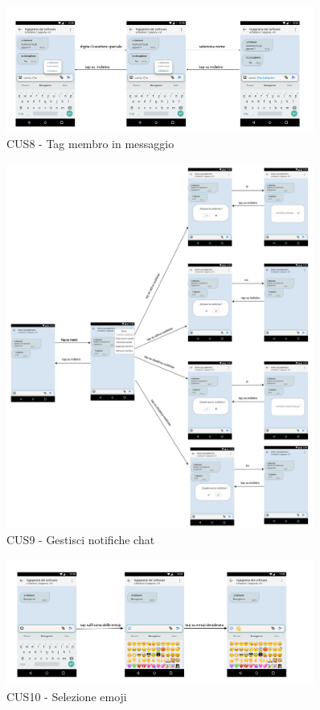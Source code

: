 \begin{figure}
	\centering
	\includegraphics[width=0.9\textwidth]{imgs/gruppo6/activities/act_cus8_tag_membro_messaggio.pdf}
	\caption{CUS8 - Tag membro in messaggio}
	\label{fig:cus8}
\end{figure}

\begin{figure}
	\centering
	\includegraphics[width=0.9\textwidth]{imgs/gruppo6/activities/act_cus9_gestisci_notifiche_chat.pdf}
	\caption{CUS9 - Gestisci notifiche chat}
	\label{fig:cus9}
\end{figure}

\begin{figure}
	\centering
	\includegraphics[width=0.9\textwidth]{imgs/gruppo6/activities/act_cus10_seleziona_emoji.pdf}
	\caption{CUS10 - Selezione emoji}
	\label{fig:cus10}
\end{figure}

